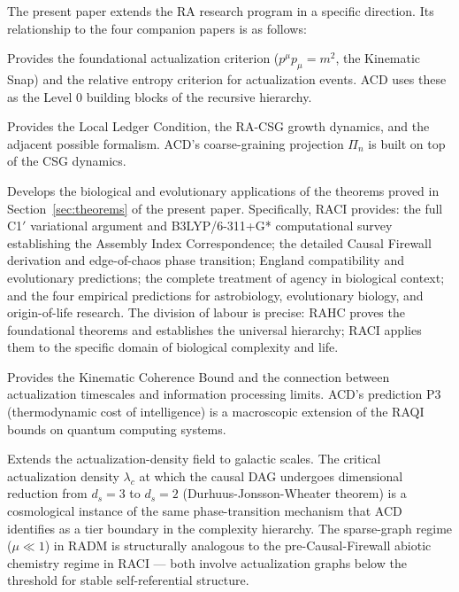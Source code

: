 \documentclass[11pt,a4paper]{article}
\theoremstyle{remark}
\begin{document}
The present paper extends the RA research program in a specific direction. Its
relationship to the four companion papers is as follows:

\begin{description}[leftmargin=1.5em]
  \item[\textbf{RAQM}~\citep{Sandeman2026a}] Provides the foundational actualization
    criterion ($p^{\mu}p_{\mu} = m^2$, the Kinematic Snap) and the relative
    entropy criterion for actualization events. ACD uses these as the Level 0
    building blocks of the recursive hierarchy.

  \item[\textbf{RAGC}~\citep{Sandeman2026b}] Provides the Local Ledger Condition,
    the RA-CSG growth dynamics, and the adjacent possible formalism. ACD's
    coarse-graining projection $\Pi_n$ is built on top of the CSG dynamics.

  \item[\textbf{RACI}~\citep{Sandeman2026c}] Develops the biological and
    evolutionary applications of the theorems proved in Section~\ref{sec:theorems}
    of the present paper. Specifically, RACI provides: the full C1$'$ variational
    argument and B3LYP/6-311+G* computational survey establishing the Assembly
    Index Correspondence; the detailed Causal Firewall derivation and edge-of-chaos
    phase transition; England compatibility and evolutionary predictions; the
    complete treatment of agency in biological context; and the four empirical
    predictions for astrobiology, evolutionary biology, and origin-of-life
    research. The division of labour is precise: RAHC proves the foundational
    theorems and establishes the universal hierarchy; RACI applies them to the
    specific domain of biological complexity and life.

  \item[\textbf{RAQI}~\citep{Sandeman2026d}] Provides the Kinematic Coherence
    Bound and the connection between actualization timescales and information
    processing limits. ACD's prediction P3 (thermodynamic cost of intelligence)
    is a macroscopic extension of the RAQI bounds on quantum computing systems.

  \item[\textbf{RADM}~\citep{Sandeman2026RADM}] Extends the actualization-density
    field to galactic scales. The critical actualization density $\lambda_c$ at
    which the causal DAG undergoes dimensional reduction from $d_s = 3$ to
    $d_s = 2$ (Durhuus-Jonsson-Wheater theorem) is a cosmological instance of
    the same phase-transition mechanism that ACD identifies as a tier boundary
    in the complexity hierarchy. The sparse-graph regime ($\mu \ll 1$) in RADM
    is structurally analogous to the pre-Causal-Firewall abiotic chemistry
    regime in RACI --- both involve actualization graphs below the threshold
    for stable self-referential structure.


\end{description}
\end{document}
